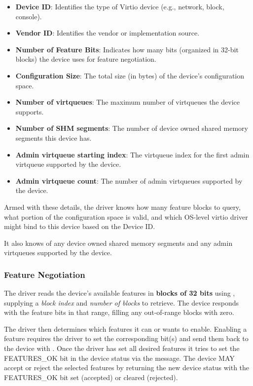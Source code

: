 \begin{itemize}
  \item \textbf{Device ID}: Identifies the type of Virtio device (e.g., network,
    block, console).
  \item \textbf{Vendor ID}: Identifies the vendor or implementation source.
  \item \textbf{Number of Feature Bits}: Indicates how many bits (organized in
    32-bit blocks) the device uses for feature negotiation.
  \item \textbf{Configuration Size}: The total size (in bytes) of the device's
    configuration space.
  \item \textbf{Number of virtqueues}: The maximum number of virtqueues the
    device supports.
  \item \textbf{Number of SHM segments}: The number of device owned
    shared memory segments this device has.
  \item \textbf{Admin virtqueue starting index}: The virtqueue index for the
    first admin virtqueue supported by the device.
  \item \textbf{Admin virtqueue count}: The number of admin virtqueues
    supported by the device.
\end{itemize}

Armed with these details, the driver knows how many feature blocks to query,
what portion of the configuration space is valid, and which OS-level virtio
driver might bind to this device based on the Device ID.

It also knows of any device owned shared memory segments and any admin
virtqueues supported by the device.

\subsubsection{Feature Negotiation}
\label{sec:Virtio Transport Options / Virtio Over Messages / Device Initialization / Device Features}

The driver reads the device's available features in \textbf{blocks of 32 bits}
using , supplying a \emph{block index} and
\emph{number of blocks} to retrieve. The device responds with the feature bits
in that range, filling any out-of-range blocks with zero.

The driver then determines which features it can or wants to enable. Enabling a
feature requires the driver to set the corresponding bit(s) and send
them back to the device with . Once the driver has
set all desired features it tries to set the FEATURES_OK bit in the device status
via the  message.  The device MAY accept or reject the
selected features by returning the new device status with the FEATURES_OK bit
set (accepted) or cleared (rejected).

